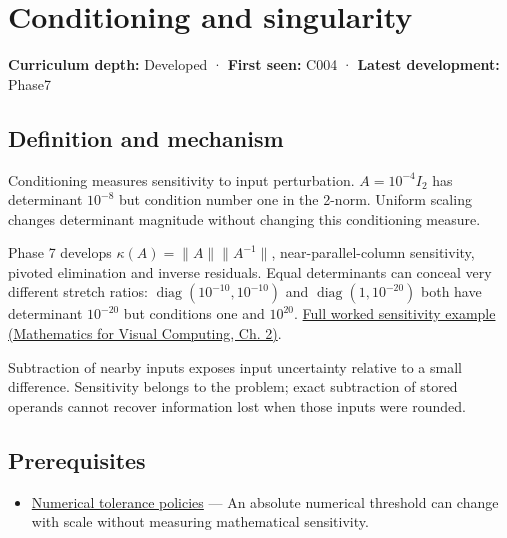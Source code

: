 \hypertarget{appendix-8f6a01f284a7}{}\label{referencestart:appendix-8f6a01f284a7}
\section{Conditioning and singularity}\label{appendix-8f6a01f284a7-conditioning-and-singularity}

\textbf{Curriculum depth:} Developed · \textbf{First seen:} C004 · \textbf{Latest development:} Phase7

\begin{allmightroledefinition}

\subsection{Definition and mechanism}\label{appendix-8f6a01f284a7-definition-and-mechanism}

Conditioning measures sensitivity to input perturbation. \(A=10^{-4}I_2\) has determinant \(10^{-8}\) but condition number one in the 2-norm. Uniform scaling changes determinant magnitude without changing this conditioning measure.

\end{allmightroledefinition}

Phase 7 develops \(\kappa(A)=\|A\|\|A^{-1}\|\), near-parallel-column sensitivity, pivoted elimination and inverse residuals. Equal determinants can conceal very different stretch ratios: \(\operatorname{diag}(10^{-10},10^{-10})\) and \(\operatorname{diag}(1,10^{-20})\) both have determinant \(10^{-20}\) but conditions one and \(10^{20}\). \href{../02-Mathematics-for-Visual-Computing/main.pdf\#nameddest=01-foundations-i-ch018-an-inverse-can-exist-and-still-amplify-uncertainty}{Full worked sensitivity example (Mathematics for Visual Computing, Ch. 2)}.

Subtraction of nearby inputs exposes input uncertainty relative to a small difference. Sensitivity belongs to the problem; exact subtraction of stored operands cannot recover information lost when those inputs were rounded.

\subsection{Prerequisites}\label{appendix-8f6a01f284a7-prerequisites}

\begin{itemize}
\tightlist
\item
  \hyperref[appendix-0ec599f8ba27]{Numerical tolerance policies} --- An absolute numerical threshold can change with scale without measuring mathematical sensitivity.
\end{itemize}

